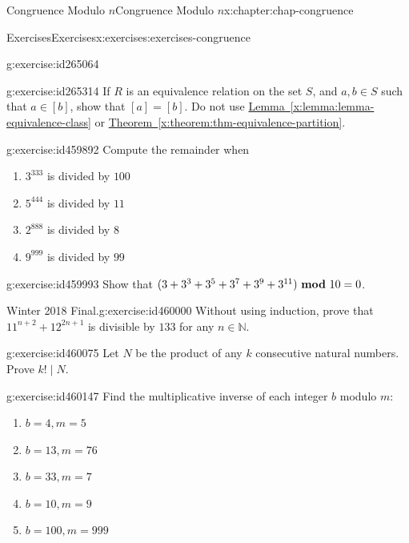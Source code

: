 \documentclass[oneside,10pt,]{book}
\newcommand{\xreffont}{\relax}
\numberwithin{equation}{section}
\newcommand{\mmod}[1]{\ \mathrm{\bf mod}\ #1}
\begin{document}
\begin{chapterptx}{Congruence Modulo \(n\)}{}{Congruence Modulo \(n\)}{}{}{x:chapter:chap-congruence}
\begin{exercises-section}{Exercises}{}{Exercises}{}{}{x:exercises:exercises-congruence}
\begin{divisionexercise}{4}{}{}{g:exercise:id265064}
\end{divisionexercise}%
\begin{divisionexercise}{5}{}{}{g:exercise:id265314}%
If \(R\) is an equivalence relation on the set \(S\), and \(a, b \in S\) such that \(a \in [b]\), show that \([a] = [b]\). Do not use \hyperref[x:lemma:lemma-equivalence-class]{Lemma~{\xreffont\ref{x:lemma:lemma-equivalence-class}}} or \hyperref[x:theorem:thm-equivalence-partition]{Theorem~{\xreffont\ref{x:theorem:thm-equivalence-partition}}}.%
\end{divisionexercise}%
\begin{divisionexercise}{6}{}{}{g:exercise:id459892}%
Compute the remainder when%
\begin{enumerate}[label=(\alph*)]
\item{}\(3^{333}\) is divided by \(100\)%
\item{}\(5^{444}\) is divided by \(11\)%
\item{}\(2^{888}\) is divided by \(8\)%
\item{}\(9^{999}\) is divided by \(99\)%
\end{enumerate}
%
\end{divisionexercise}%
\begin{divisionexercise}{7}{}{}{g:exercise:id459993}%
Show that \((3 + 3^3 + 3^5 + 3^7 + 3^9 + 3^{11}) \mmod{10} = 0\).%
\end{divisionexercise}%
\begin{divisionexercise}{8}{Winter 2018 Final.}{}{g:exercise:id460000}%
Without using induction, prove that \(11^{n+2} + 12^{2n+1}\) is divisible by \(133\) for any \(n \in \mathbb{N}\).%
\end{divisionexercise}%
\begin{divisionexercise}{9}{}{}{g:exercise:id460075}%
Let \(N\) be the product of any \(k\) consecutive natural numbers. Prove \(k! \mid N\).%
\end{divisionexercise}%
\begin{divisionexercise}{10}{}{}{g:exercise:id460147}%
Find the multiplicative inverse of each integer \(b\) modulo \(m\):%
\begin{enumerate}[label=(\alph*)]
\item{}\(\displaystyle b = 4, m = 5\)%
\item{}\(\displaystyle b = 13, m = 76\)%
\item{}\(\displaystyle b = 33, m = 7\)%
\item{}\(\displaystyle b = 10, m = 9\)%
\item{}\(\displaystyle b = 100, m = 999\)%

\end{enumerate}
\end{divisionexercise}
\end{exercises-section}
\end{chapterptx}
\end{document}

